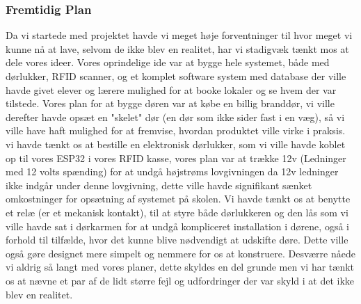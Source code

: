     \subsubsection{Fremtidig Plan}
    Da vi startede med projektet havde vi meget høje forventninger til hvor meget vi kunne nå at lave, selvom de ikke blev en realitet,
    har vi stadigvæk tænkt mos at dele vores ideer. 
    \newline
    \newline
    Vores oprindelige ide var at bygge hele systemet, både med dørlukker, RFID scanner, og et komplet software system med database der ville havde givet elever og lærere
    mulighed for at booke lokaler og se hvem der var tilstede. Vores plan for at bygge døren var at købe en billig branddør,
    vi ville derefter havde opsæt en "skelet" dør (en dør som ikke sider fast i en væg), så vi ville have haft mulighed for at fremvise, hvordan produktet ville virke i praksis.
    vi havde tænkt os at bestille en elektronisk dørlukker, som vi ville havde koblet op til vores ESP32 i vores RFID kasse,
    vores plan var at trække 12v (Ledninger med 12 volts spænding) for at undgå højstrøms lovgivningen da 12v ledninger ikke indgår under denne lovgivning,
    dette ville havde signifikant sænket omkostninger for opsætning af systemet på skolen. Vi havde tænkt os at benytte et relæ (er et mekanisk kontakt),
    til at styre både dørlukkeren og den lås som vi ville havde sat i dørkarmen for at undgå kompliceret installation i dørene,
    også i forhold til tilfælde, hvor det kunne blive nødvendigt at udskifte døre. Dette ville også gøre designet mere simpelt og nemmere
    for os at konstruere. Desværre nåede vi aldrig så langt med vores planer, dette skyldes en del grunde men vi har tænkt os at nævne
    et par af de lidt større fejl og udfordringer der var skyld i at det ikke blev en realitet.
